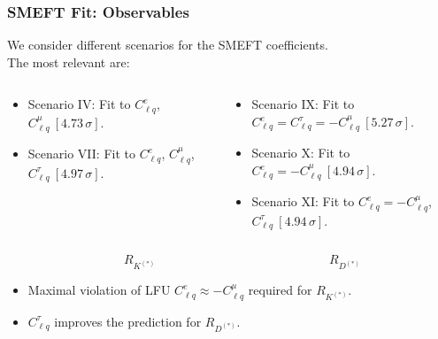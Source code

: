 \documentclass[mathserif, 10pt, dvipsnames]{beamer}
\begin{document}
\begin{frame}\frametitle{SMEFT Fit: Observables}

We consider different scenarios for the SMEFT coefficients.\\[0.3em]
The most relevant are: \vspace{-0.5cm}
{\scriptsize
\hspace*{-2em}%
\begin{minipage}[t][2.5cm][t]{\textwidth}
\begin{columns}[onlytextwidth]
\begin{column}{0.52\textwidth}
\begin{itemize}
\item Scenario IV: Fit to $C_{\ell q}^e$, $C_{\ell q}^\mu\ [4.73\,\sigma]$.
\item Scenario VII: Fit to $C_{\ell q}^e$, $C_{\ell q}^\mu$, $C_{\ell q}^\tau\ [4.97\,\sigma]$.
\end{itemize}
\end{column}
\begin{column}{0.58\textwidth}
\begin{itemize}
\item Scenario IX: Fit to $C_{\ell q}^e = C_{\ell q}^\tau = - C_{\ell q}^\mu\ [5.27\,\sigma]$.
\item Scenario X: Fit to $C_{\ell q}^e =  - C_{\ell q}^\mu\ [4.94\,\sigma]$.
\item Scenario XI: Fit to $C_{\ell q}^e = - C_{\ell q}^\mu$, $C_{\ell q}^\tau\ [4.94\,\sigma]$.
\end{itemize}
\end{column}
\end{columns}
\end{minipage}
}\vspace*{-1.0cm}
    \begin{figure}\begin{center}
{\small{$$\qquad R_{K^{(*)}}\qquad\qquad\qquad\qquad\qquad\qquad\qquad R_{D^{(*)}}$$}}
\resizebox{0.50\textwidth}{!}{}
\resizebox{0.35\textwidth}{!}{}
        \end{center}
    \end{figure}
    \begin{itemize}
\item Maximal violation of LFU $C_{\ell q}^e \approx - C_{\ell q}^\mu$ required for $R_{K^{(*)}}$.
\item $C_{\ell q}^\tau$ improves the prediction for $R_{D^{(*)}}$.
    \end{itemize}

\end{frame}
\end{document}

